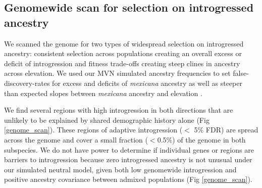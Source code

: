 \subsection*{Genomewide scan for selection on introgressed ancestry}
We scanned the genome for two types of widespread selection on introgressed ancestry: consistent selection across populations creating an overall excess or deficit of introgression and fitness trade-offs creating steep clines in \mexicana ancestry across elevation. 
We used our MVN simulated ancestry frequencies to set false-discovery-rates for excess and deficits of \textit{mexicana} ancestry as well as steeper than expected slopes between \textit{mexicana} ancestry and elevation .

We find several regions with high introgression in both directions that are unlikely to be explained by shared demographic history alone (Fig \ref{genome_scan}). These regions of adaptive introgression ($<$ 5\% FDR) are spread across the genome and cover a small fraction ($<$0.5\%) of the genome in both subspecies. We do not have power to determine if individual genes or regions are barriers to introgression because zero introgressed ancestry is not unusual under our simulated neutral model, given both low genomewide introgression and positive ancestry covariance between admixed populations (Fig \ref{genome_scan}). 

